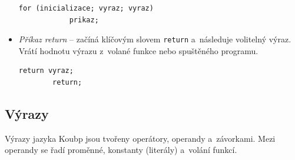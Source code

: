 \begin{itemize}
\begin{lstlisting}[language=Koubp]
        for (inicializace; vyraz; vyraz) 
            prikaz;
    \end{lstlisting}
    \item \emph{Příkaz return} -- začíná klíčovým slovem \texttt{return} a~následuje volitelný výraz.
    Vrátí hodnotu výrazu z~volané funkce nebo spuštěného programu.
    \begin{lstlisting}[language=Koubp]
        return vyraz;
        return;
    \end{lstlisting}
\end{itemize}

\subsection*{Výrazy}
Výrazy jazyka Koubp jsou tvořeny operátory, operandy a~závorkami.
Mezi operandy se řadí proměnné, konstanty (literály) a~volání funkcí.

